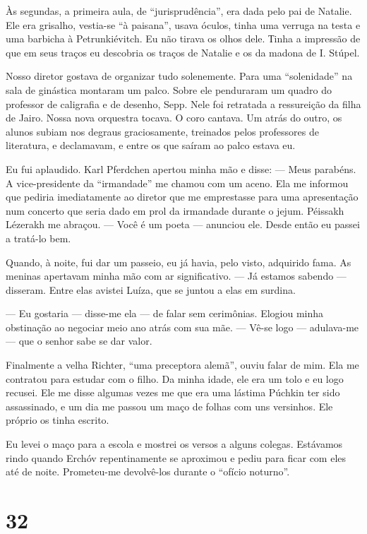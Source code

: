 Às segundas, a primeira aula, de ``jurisprudência'', era dada pelo pai
de Natalie. Ele era grisalho, vestia-se ``à paisana'', usava óculos,
tinha uma verruga na testa e uma barbicha à Petrunkiévitch. Eu não
tirava os olhos dele. Тinha a impressão de que em seus traços eu
descobria os traços de Natalie e os da madona de I. Stúpel.

Nosso diretor gostava de organizar tudo solenemente. Para uma
``solenidade'' na sala de ginástica montaram um palco. Sobre ele
penduraram um quadro do professor de caligrafia e de desenho, Sepp. Nele
foi retratada a ressureição da filha de Jairo. Nossa nova orquestra
tocava. O coro cantava. Um atrás do outro, os alunos subiam nos degraus
graciosamente, treinados pelos professores de literatura, e declamavam,
e entre os que saíram ao palco estava eu.

Eu fui aplaudido. Karl Pferdchen apertou minha mão e disse: --- Meus
parabéns. A vice-presidente da ``irmandade'' me chamou com um aceno. Ela
me informou que pediria imediatamente ao diretor que me emprestasse para
uma apresentação num concerto que seria dado em prol da irmandade
durante o jejum. Péissakh Lézerakh me abraçou. --- Você é um poeta ---
anunciou ele. Desde então eu passei a tratá-lo bem.

Quando, à noite, fui dar um passeio, eu já havia, pelo visto, adquirido
fama. As meninas apertavam minha mão com ar significativo. --- Já
estamos sabendo --- disseram. Entre elas avistei Luíza, que se juntou a
elas em surdina.

--- Eu gostaria --- disse-me ela --- de falar sem cerimônias. Elogiou
minha obstinação ao negociar meio ano atrás com sua mãe. --- Vê-se logo
--- adulava-me --- que o senhor sabe se dar valor.

Finalmente a velha Richter, ``uma preceptora alemã'', ouviu falar de
mim. Ela me contratou para estudar com o filho. Da minha idade, ele era
um tolo e eu logo recusei. Ele me disse algumas vezes me que era uma
lástima Púchkin ter sido assassinado, e um dia me passou um maço de
folhas com uns versinhos. Ele próprio os tinha escrito.

Eu levei o maço para a escola e mostrei os versos a alguns colegas.
Estávamos rindo quando Erchóv repentinamente se aproximou e pediu para
ficar com eles até de noite. Prometeu-me devolvê-los durante o ``ofício
noturno''.

\section{32}

